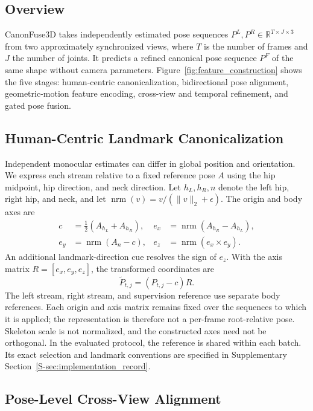 \documentclass[preprint,12pt]{elsarticle}
\begin{document}
\subsection{Overview}
\label{subsec:method_overview}

CanonFuse3D takes independently estimated pose sequences \(P^L,P^R\in\mathbb{R}^{T\times J\times3}\) from two approximately synchronized views, where \(T\) is the number of frames and \(J\) the number of joints. It predicts a refined canonical pose sequence \(P^F\) of the same shape without camera parameters. Figure~\ref{fig:feature_construction} shows the five stages: human-centric canonicalization, bidirectional pose alignment, geometric-motion feature encoding, cross-view and temporal refinement, and gated pose fusion.

\subsection{Human-Centric Landmark Canonicalization}
\label{subsec:canonicalization}

Independent monocular estimates can differ in global position and orientation. We express each stream relative to a fixed reference pose \(A\) using the hip midpoint, hip direction, and neck direction. Let \(h_L,h_R,n\) denote the left hip, right hip, and neck, and let \(\operatorname{nrm}(v)=v/(\|v\|_2+\epsilon)\). The origin and body axes are
\[
\begin{aligned}
c&=\tfrac12(A_{h_L}+A_{h_R}), &
e_x&=\operatorname{nrm}(A_{h_R}-A_{h_L}),\\
e_y&=\operatorname{nrm}(A_n-c), &
e_z&=\operatorname{nrm}(e_x\times e_y).
\end{aligned}
\]
An additional landmark-direction cue resolves the sign of \(e_z\). With the axis matrix \(R=[e_x,e_y,e_z]\), the transformed coordinates are
\[
\tilde{P}_{t,j}=(P_{t,j}-c)R.
\]
The left stream, right stream, and supervision reference use separate body references. Each origin and axis matrix remains fixed over the sequences to which it is applied; the representation is therefore not a per-frame root-relative pose. Skeleton scale is not normalized, and the constructed axes need not be orthogonal. In the evaluated protocol, the reference is shared within each batch. Its exact selection and landmark conventions are specified in Supplementary Section~\ref{S-sec:implementation_record}.

\subsection{Pose-Level Cross-View Alignment}
\label{subsec:pose_alignment}
\end{document}
